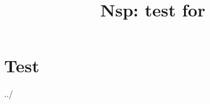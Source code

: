 \documentclass[11pt]{book}
\title{Nsp: test for \manname}
\def\dir{../}
\begin{document}
\maketitle


\chapter{Test}

 \dir \manname


\end{document}
